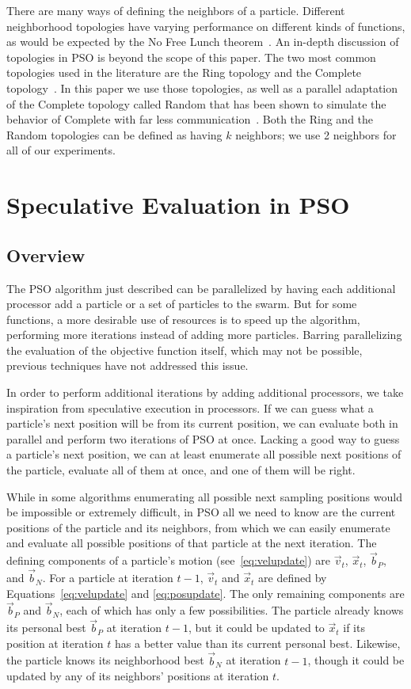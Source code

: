 \documentclass[conference,letterpaper]{IEEEtran}
\providecommand{\ppos}{\ensuremath{\Vec{x}}}
\providecommand{\pvel}{\ensuremath{\Vec{v}}}
\providecommand{\nbest}{\ensuremath{\Vec{b}_N}}
\providecommand{\pbest}{\ensuremath{\Vec{b}_P}}
\begin{document}
There are many ways of defining the neighbors of a particle.  Different
neighborhood topologies have varying performance on different kinds of
functions, as would be expected by the No Free Lunch
theorem~\cite{wolpert-tec97}.  An in-depth discussion of topologies in PSO is
beyond the scope of this paper.  The two most common topologies used in the
literature are the Ring topology and the Complete
topology~\cite{bratton-sis07}.  In this paper we use those topologies, as well
as a parallel adaptation of the Complete topology called Random that has been
shown to simulate the behavior of Complete with far less
communication~\cite{mcnabb-cec09}.  Both the Ring and the Random topologies can
be defined as having $k$ neighbors; we use 2 neighbors for all of our
experiments.

\section{Speculative Evaluation in PSO}
\label{sec:sepso}
\subsection{Overview}

The PSO algorithm just described can be parallelized by having each additional
processor add a particle or a set of particles to the swarm.  But for some
functions, a more desirable use of resources is to speed up the algorithm,
performing more iterations instead of adding more particles.  Barring
parallelizing the evaluation of the objective function itself, which may not be
possible, previous techniques have not addressed this issue.

In order to perform additional iterations by adding additional processors, we
take inspiration from speculative execution in processors.  If we can guess
what a particle's next position will be from its current position, we can
evaluate both in parallel and perform two iterations of PSO at once.  Lacking
a good way to guess a particle's next position, we can at least enumerate all
possible next positions of the particle, evaluate all of them at once, and one
of them will be right.

While in some algorithms enumerating all possible next sampling positions would
be impossible or extremely difficult, in PSO all we need to know are the
current positions of the particle and its neighbors, from which we can easily
enumerate and evaluate all possible positions of that particle at the next
iteration.  The defining components of a particle's motion
(see~\eqref{eq:velupdate}) are $\pvel_t$, $\ppos_t$, $\pbest$, and $\nbest$.
For a particle at iteration $t-1$, $\pvel_t$ and $\ppos_t$ are defined by
Equations~\eqref{eq:velupdate} and \eqref{eq:posupdate}.  The only remaining
components are $\pbest$ and $\nbest$, each of which has only a few
possibilities.  The particle already knows its personal best $\pbest$ at
iteration $t-1$, but it could be updated to $\ppos_t$ if its position at
iteration $t$ has a better value than its current personal best.  Likewise, the
particle knows its neighborhood best $\nbest$ at iteration $t-1$, though it
could be updated by any of its neighbors' positions at iteration $t$.
\end{document}
